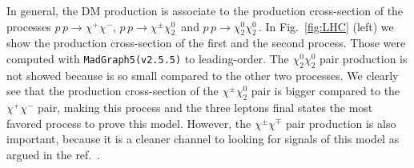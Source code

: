 \documentclass[12pt,letterpaper]{article}
\begin{document}
%
In general, the DM production is associate to the production cross-section of the processes $p\,p\to\chi^+\chi^-$, $p\,p\to\chi^{\pm}\chi_2^0\,$ and $p\,p\to\chi_2^0\chi_2^0\,$. 
In Fig.~\ref{fig:LHC} (left) we show the production cross-section of the first and the second process.
Those were computed with \texttt{MadGraph5(v2.5.5)}\cite{Alwall:2014hca} to leading-order.
The $\chi_2^0\chi_2^0$ pair production is not showed because is so small compared to the other two processes. 
We clearly see that the production cross-section of the $\chi^{\pm}\chi^0_2$ pair is bigger compared to the $\chi^{+}\chi^{-}$ pair, making this process and the three leptons final states the most favored process to prove this model.
However, the $\chi^{\pm}\chi^{\mp}$ pair production is also important, because it is a cleaner channel to looking for signals of this model as argued in the ref.~\cite{Choubey:2017yyn}.
\end{document}
